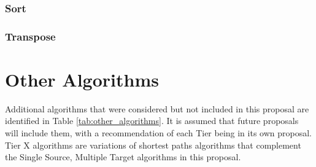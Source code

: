 \subsection{Sort}

\subsection{Transpose}




\chapter{Other Algorithms}

Additional algorithms that were considered but not included in this proposal are identified in Table \ref{tab:other_algorithms}. 
It is assumed that future proposals will include them, with a recommendation of each Tier being in its own proposal.
Tier X algorithms are variations of shortest paths algorithms that complement the Single Source, Multiple Target algorithms 
in this proposal.

